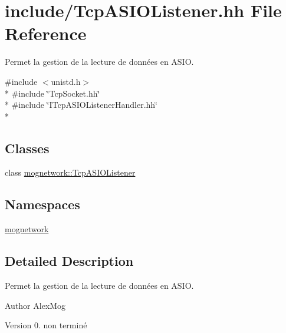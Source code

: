 \hypertarget{_tcp_a_s_i_o_listener_8hh}{\section{include/\-Tcp\-A\-S\-I\-O\-Listener.hh File Reference}
\label{_tcp_a_s_i_o_listener_8hh}
}


Permet la gestion de la lecture de données en A\-S\-I\-O.  


{\ttfamily \#include $<$unistd.\-h$>$}\\*
{\ttfamily \#include \char`\"{}Tcp\-Socket.\-hh\char`\"{}}\\*
{\ttfamily \#include \char`\"{}I\-Tcp\-A\-S\-I\-O\-Listener\-Handler.\-hh\char`\"{}}\\*
\subsection*{Classes}
\begin{DoxyCompactItemize}
\item 
class \hyperlink{classmognetwork_1_1_tcp_a_s_i_o_listener}{mognetwork\-::\-Tcp\-A\-S\-I\-O\-Listener}
\end{DoxyCompactItemize}
\subsection*{Namespaces}
\begin{DoxyCompactItemize}
\item 
\hyperlink{namespacemognetwork}{mognetwork}
\end{DoxyCompactItemize}


\subsection{Detailed Description}
Permet la gestion de la lecture de données en A\-S\-I\-O. \begin{DoxyAuthor}{Author}
Alex\-Mog 
\end{DoxyAuthor}
\begin{DoxyVersion}{Version}
0.  non terminé 
\end{DoxyVersion}
